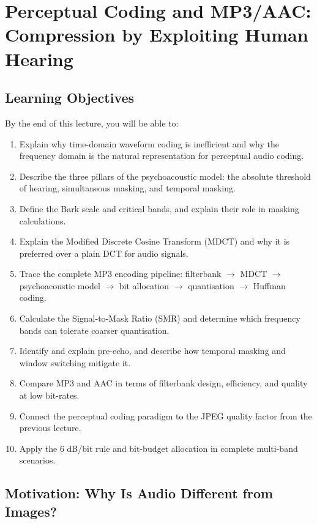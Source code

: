 \section{Perceptual Coding and MP3/AAC: Compression by Exploiting Human Hearing}

\subsection{Learning Objectives}

By the end of this lecture, you will be able to:
\begin{enumerate}[leftmargin=*, nosep]
    \item Explain why time-domain waveform coding is inefficient and why the frequency domain is the natural representation for perceptual audio coding.
    \item Describe the three pillars of the psychoacoustic model: the absolute threshold of hearing, simultaneous masking, and temporal masking.
    \item Define the Bark scale and critical bands, and explain their role in masking calculations.
    \item Explain the Modified Discrete Cosine Transform (MDCT) and why it is preferred over a plain DCT for audio signals.
    \item Trace the complete MP3 encoding pipeline: filterbank $\to$ MDCT $\to$ psychoacoustic model $\to$ bit allocation $\to$ quantisation $\to$ Huffman coding.
    \item Calculate the Signal-to-Mask Ratio (SMR) and determine which frequency bands can tolerate coarser quantisation.
    \item Identify and explain pre-echo, and describe how temporal masking and window switching mitigate it.
    \item Compare MP3 and AAC in terms of filterbank design, efficiency, and quality at low bit-rates.
    \item Connect the perceptual coding paradigm to the JPEG quality factor from the previous lecture.
    \item Apply the 6 dB/bit rule and bit-budget allocation in complete multi-band scenarios.
\end{enumerate}

\subsection{Motivation: Why Is Audio Different from Images?}

